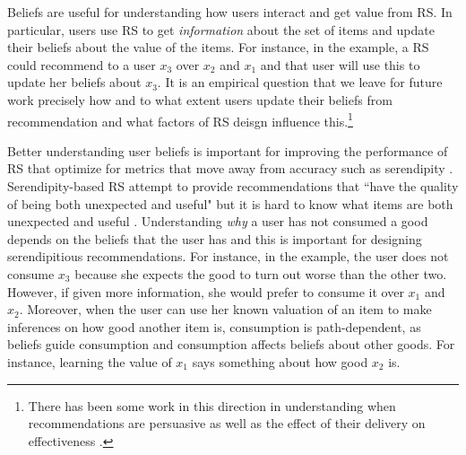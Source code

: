 \documentclass[sigconf]{acmart}
\begin{document}
\par
Beliefs are useful for understanding how users interact and get value from RS. In particular, users use RS to get \textit{information} about the set of items and update their beliefs about the value of the items. For instance, in the example, a RS could recommend to a user $x_3$ over $x_2$ and $x_1$ and that user will use this to update her beliefs about $x_3$. It is an empirical question that we leave for future work precisely how and to what extent users update their beliefs from recommendation and what factors of RS deisgn influence this.\footnote{There has been some work in this direction in understanding when recommendations are persuasive \cite{cremonesi2012investigating, gretzel2006persuasion} as well as the effect of their delivery on effectiveness \cite{murphy2014recommendation}.}
\par
Better understanding user beliefs is important for improving the performance of RS that optimize for metrics that move away from accuracy such as serendipity \cite{kotkov2016survey}. Serendipity-based RS attempt to provide recommendations that ``have the quality of being both unexpected and useful" \cite{maksai2015predicting} but it is hard to know what items are both unexpected and useful \cite{kotkov2016survey}. Understanding \textit{why} a user has not consumed a good depends on the beliefs that the user has and this is important for designing serendipitious recommendations. For instance, in the example, the user does not consume $x_3$ because she expects the good to turn out worse than the other two. However, if given more information, she would prefer to consume it over $x_1$ and $x_2$. Moreover, when the user can use her known valuation of an item to make inferences on how good another item is, consumption is path-dependent, as beliefs guide consumption and consumption affects beliefs about other goods. For instance, learning the value of $x_1$ says something about how good $x_2$ is. %
\end{document}
